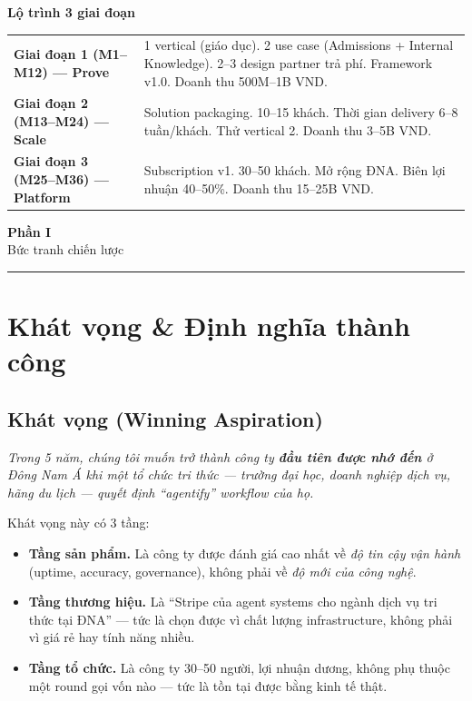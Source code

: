 \documentclass[11pt,a4paper]{article}
\begin{document}
\textbf{Lộ trình 3 giai đoạn}

\begin{tabularx}{\linewidth}{@{}p{2.8cm} X@{}}
\toprule
\textbf{Giai đoạn 1 (M1--M12) — Prove} & 1 vertical (giáo dục). 2 use case (Admissions + Internal Knowledge). 2--3 design partner trả phí. Framework v1.0. Doanh thu 500M--1B VND. \\
\textbf{Giai đoạn 2 (M13--M24) — Scale} & Solution packaging. 10--15 khách. Thời gian delivery 6--8 tuần/khách. Thử vertical 2. Doanh thu 3--5B VND. \\
\textbf{Giai đoạn 3 (M25--M36) — Platform} & Subscription v1. 30--50 khách. Mở rộng ĐNA. Biên lợi nhuận 40--50\%. Doanh thu 15--25B VND. \\
\bottomrule
\end{tabularx}

\clearpage

\begin{center}
\vspace*{0.5em}
{\sffamily\bfseries\Huge\color{ink} Phần I}\\[0.5em]
{\sffamily\LARGE\color{mid} Bức tranh chiến lược}\\[0.5em]
{\color{mid}\rule{6cm}{0.4pt}}
\end{center}
\vspace{1em}

\section{Khát vọng \& Định nghĩa thành công}

\subsection{Khát vọng (Winning Aspiration)}

\begin{quotebox}
\textit{Trong 5 năm, chúng tôi muốn trở thành công ty \textbf{đầu tiên được nhớ
đến} ở Đông Nam Á khi một tổ chức tri thức --- trường đại học, doanh nghiệp dịch
vụ, hãng du lịch --- quyết định ``agentify'' workflow của họ.}
\end{quotebox}

Khát vọng này có 3 tầng:

\begin{itemize}
\item \textbf{Tầng sản phẩm.} Là công ty được đánh giá cao nhất về \textit{độ tin
cậy vận hành} (uptime, accuracy, governance), không phải về \textit{độ mới của
công nghệ}.
\item \textbf{Tầng thương hiệu.} Là ``Stripe của agent systems cho ngành dịch
vụ tri thức tại ĐNA'' --- tức là chọn được vì chất lượng infrastructure, không
phải vì giá rẻ hay tính năng nhiều.
\item \textbf{Tầng tổ chức.} Là công ty 30--50 người, lợi nhuận dương, không phụ
thuộc một round gọi vốn nào --- tức là tồn tại được bằng kinh tế thật.
\end{itemize}
\end{document}
